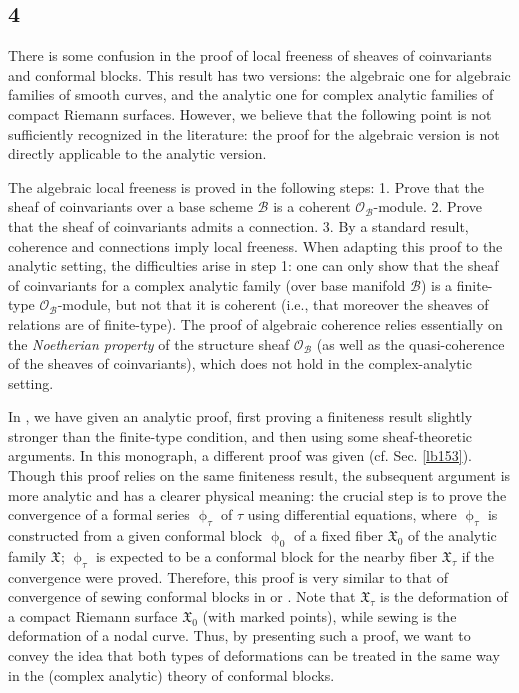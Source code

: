 \documentclass[11pt,b5paper,notitlepage]{article}
\theoremstyle{definition}
\theoremstyle{plain}
\newcommand{\fk}{\mathfrak}
\newcommand{\mc}{\mathcal}
\newcommand{\scr}{\mathscr}
\numberwithin{equation}{section}
\begin{document}
\subsection*{4}

There is some confusion in the proof of local freeness of sheaves of coinvariants and conformal blocks. This result has two versions: the algebraic one for algebraic families of smooth curves, and the analytic one for complex analytic families of compact Riemann surfaces. However, we believe that the following point is not sufficiently recognized in the literature: the proof for the algebraic version is not directly applicable to the analytic version.

The algebraic local freeness is proved in the following steps: 1. Prove that the sheaf of coinvariants over a base scheme $\mc B$ is a coherent $\scr O_{\mc B}$-module. 2. Prove that the sheaf of coinvariants admits a connection. 3. By a standard result, coherence and connections imply local freeness. When adapting this proof to the analytic setting, the difficulties arise in step 1: one can only show that the sheaf of coinvariants for a complex analytic family (over base manifold $\mc B$) is a finite-type $\scr O_{\mc B}$-module, but not that it is coherent (i.e., that moreover the sheaves of relations are of finite-type). The proof of algebraic coherence relies essentially on the \emph{Noetherian property} of the structure sheaf $\scr O_{\mc B}$ (as well as the quasi-coherence of the sheaves of coinvariants), which does not hold in the complex-analytic setting. 

In \cite{Gui}, we have given an analytic proof, first proving a finiteness result slightly stronger than the finite-type condition, and then using some sheaf-theoretic arguments. In this monograph, a different proof was given (cf. Sec. \ref{lb153}). Though this proof  relies on the same finiteness result, the subsequent argument is more analytic and has a clearer physical meaning: the crucial step is to prove the convergence of a formal series $\upphi_\tau$ of $\tau$ using differential equations, where $\upphi_\tau$ is constructed from a given conformal block $\upphi_0$ of a fixed fiber $\fk X_0$ of the analytic family $\fk X$; $\upphi_\tau$ is expected to be a conformal block for the nearby fiber $\fk X_\tau$ if the convergence were proved. Therefore, this proof is very similar to that of convergence of sewing conformal blocks in \cite{Gui} or \cite{Gui20}. Note that $\fk X_\tau$ is the deformation of a compact Riemann surface $\fk X_0$ (with marked points), while sewing is the deformation of a nodal curve. Thus, by presenting such a proof, we want to convey the idea that both types of deformations can be treated in the same way in the (complex analytic) theory of conformal blocks.
\end{document}
